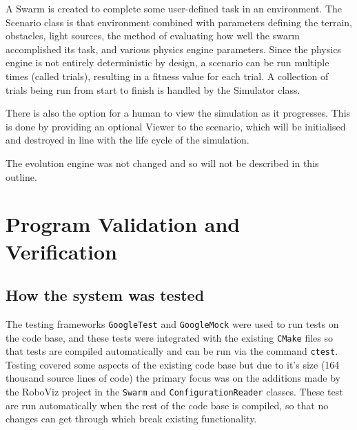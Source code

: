 \documentclass[11pt,a4paper]{article}
\begin{document}
A Swarm is created to complete some user-defined task in an environment. The
Scenario class is that environment combined with parameters defining the
terrain, obstacles, light sources, the method of evaluating how well the swarm
accomplished its task, and various physics engine parameters. Since the physics
engine is not entirely deterministic by design, a scenario can be run multiple
times (called trials), resulting in a fitness value for each trial. A
collection of trials being run from start to finish is handled by the Simulator
class.

There is also the option for a human to view the simulation as it progresses.
This is done by providing an optional Viewer to the scenario, which will be
initialised and destroyed in line with the life cycle of the simulation.

The evolution engine was not changed and so will not be described in this
outline.



\section{Program Validation and Verification}
\label{s:progr-valid-verif}
%
%
%

\subsection{How the system was tested}
The testing frameworks \texttt{GoogleTest} and \texttt{GoogleMock} were used to
run tests on the code base, and these tests were integrated with the existing
\texttt{CMake} files so that tests are compiled automatically and can be run
via the command \texttt{ctest}. Testing covered some aspects of the existing
code base but due to it's size (164 thousand source lines of code) the primary
focus was on the additions made by the RoboViz project in the \texttt{Swarm}
and \texttt{ConfigurationReader} classes. These test are run automatically when
the rest of the code base is compiled, so that no changes can get through which
break existing functionality.
\end{document}
